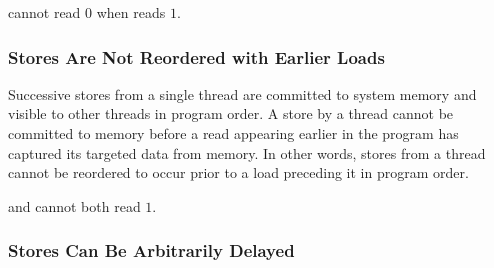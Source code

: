 \noindent
{} cannot read $0$ when  reads $1$.

\newpage

\subsubsection*{Stores Are Not Reordered with Earlier Loads}

Successive stores from a single thread are committed to system memory and visible to other threads in program order.
A store by a thread cannot be committed to memory before a read appearing earlier in the program has captured its targeted data from memory.
In other words, stores from a thread cannot be reordered to occur prior to a load preceding it in program order.

\begin{table}[!hbt]
\noindent{}
\caption[Stores Are Not Reordered with Older Loads]{Stores Are Not Reordered with Older Loads \cite[Example 2]{ref:AMD}}
\label{tbl:litmus:amd:2}
\end{table}

\noindent
{} and  cannot both read $1$.

\subsubsection*{Stores Can Be Arbitrarily Delayed}


